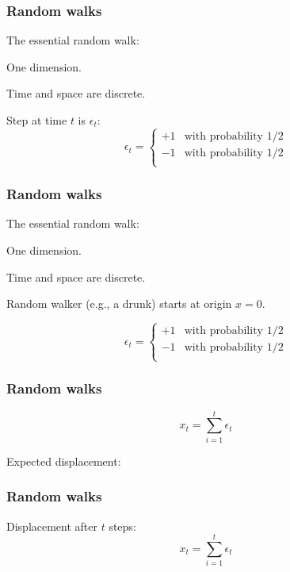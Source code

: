 \begin{frame}
  \frametitle{Random walks}

The essential random walk:

 One dimension.

 Time and space are discrete.


\inv

Step at time $t$ is $\epsilon_t$:
$$
\epsilon_t = 
\left\{
    \begin{array}{ll}
      +1 & \mbox{with probability 1/2} \\
      -1 & \mbox{with probability 1/2} \\
    \end{array}
\right.
$$


\end{frame}

\begin{frame}
  \frametitle{Random walks}

The essential random walk:

 One dimension.

 Time and space are discrete.

Random walker (e.g., a drunk) starts at origin $x=0$.

$$
\epsilon_t = 
\left\{
    \begin{array}{ll}
      +1 & \mbox{with probability 1/2} \\
      -1 & \mbox{with probability 1/2} \\
    \end{array}
\right.
$$


\end{frame}

\begin{frame}
  \frametitle{Random walks}

$$x_t = \sum_{i=1}^{t} \epsilon_t$$

\inv

Expected displacement:

\end{frame}

\begin{frame}
  \frametitle{Random walks}

Displacement after $t$ steps:
$$x_t = \sum_{i=1}^{t} \epsilon_t$$


\end{frame}

